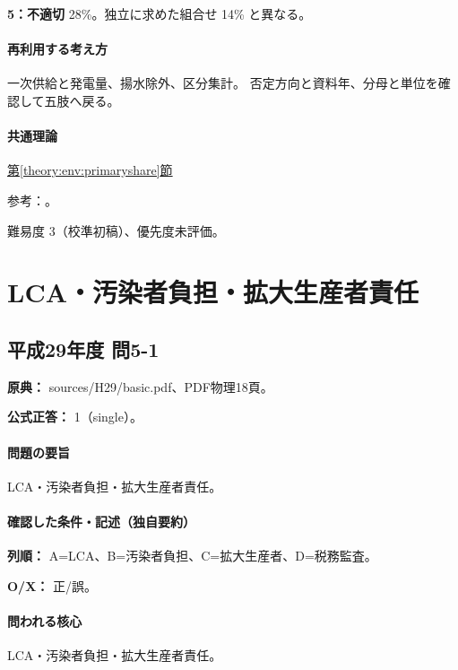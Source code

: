 \noindent\textbf{5：不適切} 28\%。独立に求めた組合せ 14\% と異なる。\par

\paragraph{再利用する考え方} 一次供給と発電量、揚水除外、区分集計。 否定方向と資料年、分母と単位を確認して五肢へ戻る。

\paragraph{共通理論} \hyperref[theory:env:primaryshare]{第\ref*{theory:env:primaryshare}節}

\par 参考：\cite{env60_energy2022}。

\par 難易度 3（校準初稿）、優先度未評価。

\section{LCA・汚染者負担・拡大生産者責任}

\subsection{平成29年度 問5-1}
\label{q:h29-reg-basic-5-1}

\noindent\textbf{原典：} sources/H29/basic.pdf、PDF物理18頁。

\textbf{公式正答：} 1（single）。

\paragraph{問題の要旨} LCA・汚染者負担・拡大生産者責任。

\paragraph{確認した条件・記述（独自要約）}\mbox{}\par

\noindent\textbf{列順：} A=\allowbreak{}LCA、B=汚染者負担、C=拡大生産者、D=税務監査。\par

\noindent\textbf{O/X：} 正/誤。\par

\paragraph{問われる核心} LCA・汚染者負担・拡大生産者責任。

